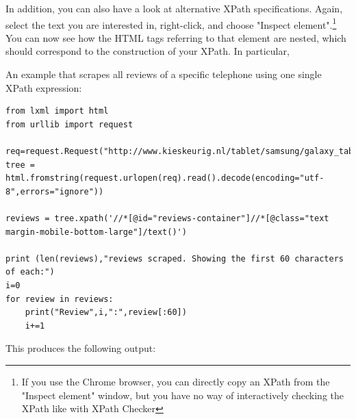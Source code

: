 \documentclass[a4paper,12pt]{book}
\renewcommand{\texttt}[1]{%
  \begingroup
  \ttfamily
  \begingroup\lccode`~=`/\lowercase{\endgroup\def~}{/\discretionary{}{}{}}%
  \begingroup\lccode`~=`[\lowercase{\endgroup\def~}{[\discretionary{}{}{}}%
  \begingroup\lccode`~=`.\lowercase{\endgroup\def~}{.\discretionary{}{}{}}%
  \begingroup\lccode`~=`(\lowercase{\endgroup\def~}{(\discretionary{}{}{}}%
  \catcode`/=\active\catcode`[=\active\catcode`.=\active\catcode`(=\active
  \scantokens{#1\noexpand}%
  \endgroup
}
\begin{document}

In addition, you can also have a look at alternative XPath specifications. Again, select the text you are interested in, right-click, and choose "Inspect element".\footnote{If you use the Chrome browser, you can directly copy an XPath from the "Inspect element" window, but you have no way of interactively checking the XPath like with XPath Checker} You can now see how the HTML tags referring to that element are nested, which should correspond to the construction of your XPath. In particular,

An example that scrapes all reviews of a specific telephone using one single XPath expression:

\begin{lstlisting}
from lxml import html
from urllib import request

req=request.Request("http://www.kieskeurig.nl/tablet/samsung/galaxy_tab_3_101_wifi_16gb/reviews/1344691")
tree = html.fromstring(request.urlopen(req).read().decode(encoding="utf-8",errors="ignore"))        

reviews = tree.xpath('//*[@id="reviews-container"]//*[@class="text margin-mobile-bottom-large"]/text()')

print (len(reviews),"reviews scraped. Showing the first 60 characters of each:")
i=0
for review in reviews:
    print("Review",i,":",review[:60])
    i+=1
\end{lstlisting}


This produces the following output:
\end{document}
